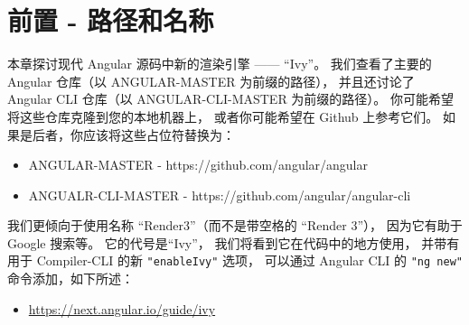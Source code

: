 \section{前置 - 路径和名称}


本章探讨现代 Angular 源码中新的渲染引擎 —— “Ivy”。
我们查看了主要的 Angular 仓库（以 ANGULAR-MASTER 为前缀的路径），
并且还讨论了 Angular CLI 仓库（以 ANGULAR-CLI-MASTER 为前缀的路径）。
你可能希望将这些仓库克隆到您的本地机器上，
或者你可能希望在 Github 上参考它们。
如果是后者，你应该将这些占位符替换为：

\begin{itemize}
  \item ANGULAR-MASTER - https://github.com/angular/angular
  \item ANGUALR-CLI-MASTER - https://github.com/angular/angular-cli
\end{itemize}


我们更倾向于使用名称 “Render3”（而不是带空格的 “Render 3”），
因为它有助于 Google 搜索等。
它的代号是“Ivy”，
我们将看到它在代码中的地方使用，
并带有用于 Compiler-CLI 的新 \texttt{"enableIvy"} 选项，
可以通过 Angular CLI 的 \texttt{"ng new"} 命令添加，如下所述：

\begin{itemize}
  \item \url{https://next.angular.io/guide/ivy}
\end{itemize}
